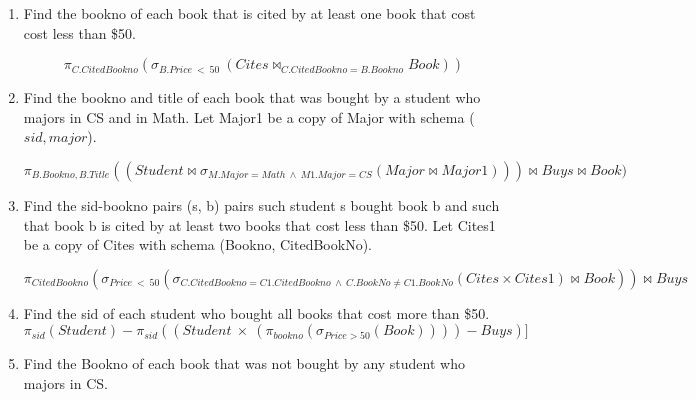 \documentclass{article}
\begin{document}
\begin{enumerate}
    \item %
    Find the bookno of each book that is cited by at least one book that cost cost less than \$50.

    \begin{displaymath}
            \pi_{C.CitedBookno}(\sigma_{B.Price\ <\ 50}\ (Cites\bowtie_{C.CitedBookno=B.Bookno} Book))
    \end{displaymath}

    \item %
    Find the bookno and title of each book that was bought by a student who majors in CS and in Math. Let Major1 be a copy of Major with schema ($sid,major$).

    \begin{displaymath}
        \pi_{B.Bookno, B.Title}((Student \bowtie \sigma_{M.Major=Math\ \wedge\ M1.Major=CS} (Major \bowtie Major1))) \bowtie Buys \bowtie Book)
    \end{displaymath}

    \item %
    Find the sid-bookno pairs (s, b) pairs such student s bought book b and
    such that book b is cited by at least two books that cost less than \$50. Let Cites1 be a copy of Cites with schema (Bookno, CitedBookNo).

    \begin{displaymath}
        \pi_{CitedBookno}(\sigma_{Price\ <\ 50} (\sigma_{C.CitedBookno=C1.CitedBookno\ \wedge\ C.BookNo \ne C1.BookNo}(Cites \times Cites1) \bowtie Book)) \bowtie Buys
    \end{displaymath}

    \item %
    Find the sid of each student who bought all books that cost more than \$50.
    \begin{displaymath}
        \pi_{sid}(Student) -
            \pi_{sid}((Student\ \times\ (\pi_{bookno}(\sigma_{Price > 50}(Book)))) %
            - Buys)] %
    \end{displaymath}

    \item %
    Find the Bookno of each book that was not bought by any student who majors in CS.


\end{enumerate}
\end{document}
